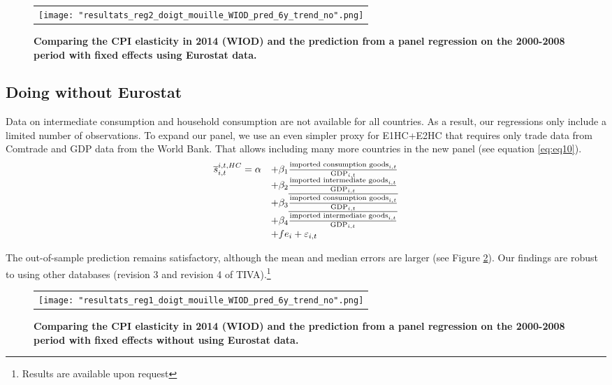 \documentclass[11pt,a4paper]{article}
\begin{document}
\begin{figure}[!h]
	\centering
	\caption{\footnotesize{\textbf{Comparing the CPI elasticity in 2014 (WIOD) and the prediction from a panel regression on the 2000-2008 period with fixed effects using Eurostat data.}}}
	\begin{tabular}{c}
		\texttt{[image: "resultats\_reg2\_doigt\_mouille\_WIOD\_pred\_6y\_trend\_no".png]}\\
	\end{tabular}
	\label{fig:panel_pred1}
\end{figure}

\subsection{Doing without Eurostat}
Data on intermediate consumption and household consumption are not available for all countries.
As a result, our regressions only include a limited number of observations.
To expand our panel, we use an even simpler proxy for E1HC+E2HC that requires only trade data from Comtrade and GDP data from the World Bank. 
That allows including many more countries in the new panel (see equation \ref{eq:eq10}).
 \begin{equation}
\begin{array}{llll}
\overline{s}_{i,t}^{i,t,HC}= \alpha & +  \beta_1  \frac{\textnormal{imported consumption goods}_{i,t}}{\textnormal{GDP}_{i,t}} \\ & + \beta_2 \frac{\textnormal{imported intermediate goods}_{i,t}}{\textnormal{GDP}_{i,t}} \\
& +  \beta_3  \overline{\frac{\textnormal{imported consumption goods}_{i,t}}{\textnormal{GDP}_{i,t}}} \\
& + \beta_4 \overline{ \frac{\textnormal{imported intermediate goods}_{i,t}}{\textnormal{GDP}_{i,t}}} \\
& +fe_{i}+\varepsilon_{i,t}
\end{array}
\label{eq:eq10}
\end{equation}

The out-of-sample prediction remains satisfactory, although the mean and median errors are larger (see Figure \ref{fig:panel_pred2}). 
Our findings are robust to using other databases (revision 3 and revision 4 of TIVA).\footnote{Results are available upon request}


\begin{figure}[!h]
	\centering
	\caption{\footnotesize{\textbf{Comparing the CPI elasticity in 2014 (WIOD) and the prediction from a panel regression on the 2000-2008 period with fixed effects without using Eurostat data. }}}
	\begin{tabular}{c}
		\texttt{[image: "resultats\_reg1\_doigt\_mouille\_WIOD\_pred\_6y\_trend\_no".png]}\\
	\end{tabular}
	\label{fig:panel_pred2}
\end{figure}
\end{document}
